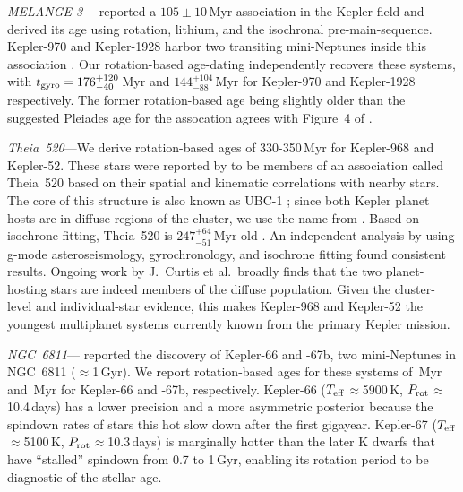 \documentclass[11pt,twocolumn,tighten]{aastex63}
\begin{document}
{\it MELANGE-3}---\citet{2022AJ....164...88B} reported a
$105\pm10$\,Myr association in the Kepler field and derived its age
using rotation, lithium, and the isochronal pre-main-sequence.
Kepler-970 and Kepler-1928 harbor two transiting mini-Neptunes inside
this association \citep{2022AJ....164...88B}.  Our rotation-based
age-dating independently recovers these systems, with $t_{\rm
gyro}=176_{-40}^{+120}$\,Myr and $144_{-88}^{+104}$\,Myr for
Kepler-970 and Kepler-1928 respectively.  The former rotation-based
age being slightly older than the suggested Pleiades age for the
assocation agrees with Figure~4 of \citet{2022AJ....164...88B}.

{\it Theia~520}---We derive rotation-based ages of 330-350\,Myr for
Kepler-968 and Kepler-52.  These stars were reported by
\citet{2019AJ....158..122K} to be members of an association called
Theia~520 based on their spatial and kinematic correlations with
nearby stars.  The core of this structure is also known as UBC-1
\citep{2018A&A...618A..59C}; since both Kepler planet hosts are in
diffuse regions of the cluster, we use the name from
\citeauthor{2019AJ....158..122K}.  Based on isochrone-fitting,
Theia~520 is $247^{+64}_{-51}$\,Myr old \citep{2019AJ....158..122K}.
An independent analysis by \citet{2024A&A...681A..13F} using g-mode
asteroseismology, gyrochronology, and isochrone fitting found
consistent results.  Ongoing work by J.~Curtis et al.~broadly finds
that the two planet-hosting stars are indeed members of the diffuse
population.  Given the cluster-level and individual-star evidence,
this makes Kepler-968 and Kepler-52 the youngest multiplanet systems
currently known from the primary Kepler mission.

{\it NGC~6811}---\citet{Meibom_2013} reported the discovery of
Kepler-66 and -67b, two mini-Neptunes in NGC~6811 ($\approx$1\,Gyr).
We report rotation-based ages for these systems of
\kepsixsixtgyro\,Myr and \kepsixseventgyro\,Myr for Kepler-66 and
-67b, respectively.  Kepler-66 ($T_{\rm eff}$$\approx$5900\,K, $P_{\rm
rot}$$\approx$10.4\,days) has a lower precision and a more asymmetric
posterior because the spindown rates of stars this hot slow down after
the first gigayear.  Kepler-67 ($T_{\rm eff}$$\approx$5100\,K, $P_{\rm
rot}$$\approx$10.3\,days) is marginally hotter than the later K dwarfs
that have ``stalled'' spindown from 0.7 to 1\,Gyr, enabling its
rotation period to be diagnostic of the stellar age.
\end{document}
